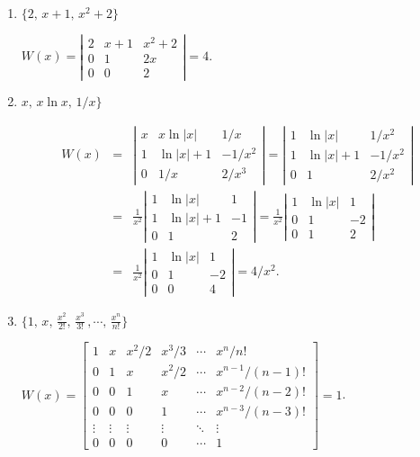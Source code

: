 \documentclass{ximera}
\begin{document}
\begin{problem}
\begin{enumerate}
\item $\{2,\,x+1,\,x^2+2\}$

\begin{solution}
$W(x)=\left|\begin{array}{ccc}2&x+1&x^2+2\\
0&1&2x\\0&0&2\end{array}\right|=4$.
\end{solution}

\item $ x,\,x\ln x,\,1/x\}$

\begin{solution}
\begin{eqnarray*}
W(x)&=&\left|\begin{array}{ccr}x&x\ln|x|&1/x
\\1&\ln|x|+1&-1/x^2\\0&1/x&2/x^3\end{array}\right|
=\left|\begin{array}{ccr}1&\ln|x|&1/x^2
\\1&\ln|x|+1&-1/x^2\\0&1&2/x^2\end{array}\right|\\
&=&\frac{1}{x^2}\left|\begin{array}{ccr}1&\ln|x|&1
\\1&\ln|x|+1&-1\\0&1&2\end{array}\right|
=\frac{1}{x^2}\left|\begin{array}{ccr}1&\ln|x|&1
\\0&1&-2\\0&1&2\end{array}\right|\\
&=&\frac{1}{x^2}\left|\begin{array}{ccr}1&\ln|x|&1
\\0&1&-2\\0&0&4\end{array}\right|
=4/x^2.
\end{eqnarray*}

\end{solution}

\item $\{1,\,x,\,\frac{x^2}{2!},\,
\frac{x^3}{3!}\,,\cdots,\,\frac{x^n}{n!}\}$

\begin{solution}
$W(x)=
\left[\begin{array}{cccccc}
1&x&x^2/2&x^3/3&\cdots&x^n/n!\\
0&1&x&x^2/2&\cdots&x^{n-1}/(n-1)!\\
0&0&1&x&\cdots&x^{n-2}/(n-2)!\\
0&0&0&1&\cdots&x^{n-3}/(n-3)!\\
\vdots&\vdots&\vdots&\vdots&\ddots&\vdots\\
0&0&0&0&\cdots&1
\end{array}\right]=1$.
\end{solution}


\end{enumerate}
\end{problem}
\end{document}
